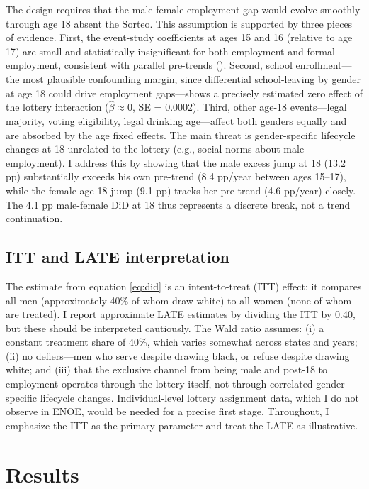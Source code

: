 \documentclass[12pt]{article}
\begin{document}
The design requires that the male-female employment gap would evolve smoothly through age 18 absent the Sorteo. This assumption is supported by three pieces of evidence. First, the event-study coefficients at ages 15 and 16 (relative to age 17) are small and statistically insignificant for both employment and formal employment, consistent with parallel pre-trends (). Second, school enrollment---the most plausible confounding margin, since differential school-leaving by gender at age 18 could drive employment gaps---shows a precisely estimated zero effect of the lottery interaction ($\hat{\beta} \approx 0$, SE = 0.0002). Third, other age-18 events---legal majority, voting eligibility, legal drinking age---affect both genders equally and are absorbed by the age fixed effects. The main threat is gender-specific lifecycle changes at 18 unrelated to the lottery (e.g., social norms about male employment). I address this by showing that the male excess jump at 18 (13.2 pp) substantially exceeds his own pre-trend (8.4 pp/year between ages 15--17), while the female age-18 jump (9.1 pp) tracks her pre-trend (4.6 pp/year) closely. The 4.1 pp male-female DiD at 18 thus represents a discrete break, not a trend continuation.

\subsection{ITT and LATE interpretation}

The estimate from equation \eqref{eq:did} is an intent-to-treat (ITT) effect: it compares all men (approximately 40\% of whom draw white) to all women (none of whom are treated). I report approximate LATE estimates by dividing the ITT by 0.40, but these should be interpreted cautiously. The Wald ratio assumes: (i) a constant treatment share of 40\%, which varies somewhat across states and years; (ii) no defiers---men who serve despite drawing black, or refuse despite drawing white; and (iii) that the exclusive channel from being male and post-18 to employment operates through the lottery itself, not through correlated gender-specific lifecycle changes. Individual-level lottery assignment data, which I do not observe in ENOE, would be needed for a precise first stage. Throughout, I emphasize the ITT as the primary parameter and treat the LATE as illustrative.


\section{Results}
\end{document}

